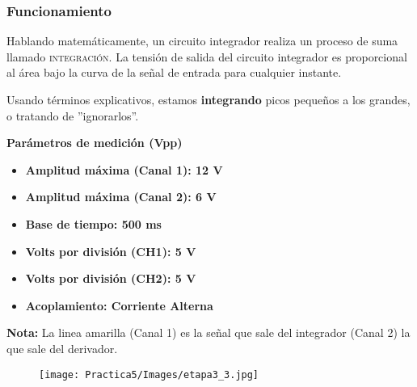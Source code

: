 \documentclass[12pt]{article}
\begin{document}
            \subsubsection{Funcionamiento}
            
             Hablando matemáticamente, un circuito integrador realiza un proceso de suma llamado \textsc{integración}. La tensión de salida del circuito integrador es proporcional al área bajo la curva de la señal de entrada para cualquier instante.
             
            Usando términos explicativos, estamos \textbf{integrando} picos pequeños a los grandes, o tratando de ''ignorarlos''.
            
         \newpage
        \textbf{Parámetros de medición (Vpp)}
            \begin{multicols}{2}
                \begin{itemize}
                    \item[\checkmark] \textbf{Amplitud máxima (Canal 1): 12 V}
                
                    \item[\checkmark] \textbf{Amplitud máxima (Canal 2): 6 V}
                    \item[\checkmark] \textbf{Base de tiempo: 500 ms}
            \columnbreak
                    \item[\checkmark] \textbf{Volts por división (CH1): 5 V}
                    \item[\checkmark] \textbf{Volts por división (CH2): 5 V}
                    \item[\checkmark] \textbf{Acoplamiento: Corriente Alterna}
                \end{itemize}
            \end{multicols}
            
            \textbf{Nota:} La linea amarilla (Canal 1) es la señal que sale del integrador (Canal 2) la que sale del derivador.
         
            \begin{figure}[h!]
                \centering
                \texttt{[image: Practica5/Images/etapa3\_3.jpg]}
            \end{figure}
            
\end{document}
